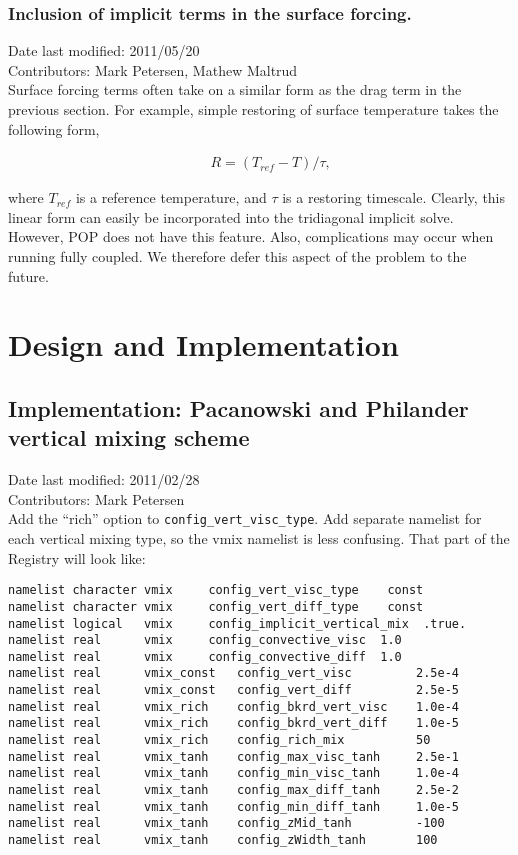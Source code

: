 \documentclass[11pt]{report}
\begin{document}
\subsection{Inclusion of implicit terms in the surface forcing.}
Date last modified: 2011/05/20 \\
Contributors: Mark Petersen, Mathew Maltrud \\

Surface forcing terms often take on a similar form as the drag term in the previous section.  For example, simple restoring of surface temperature takes the following form,

\begin{eqnarray}
&& R = (T_{ref} - T)/\tau,
\end{eqnarray}

where $T_{ref}$ is a reference temperature, and $\tau$ is a restoring timescale.  Clearly, this linear form can easily be incorporated into the tridiagonal implicit solve.  However, POP does not have this feature.  Also, complications may occur when running fully coupled.  We therefore defer this aspect of the problem to the future.


\chapter{Design and Implementation}

\section{Implementation: Pacanowski and Philander vertical mixing scheme}
Date last modified: 2011/02/28 \\
Contributors: Mark Petersen \\

Add the ``rich'' option to \verb=config_vert_visc_type=.  Add separate namelist for each vertical mixing type, so the vmix namelist is less confusing.  That part of the Registry will look like:
\begin{verbatim}
namelist character vmix     config_vert_visc_type    const
namelist character vmix     config_vert_diff_type    const
namelist logical   vmix     config_implicit_vertical_mix  .true.
namelist real      vmix     config_convective_visc  1.0
namelist real      vmix     config_convective_diff  1.0
namelist real      vmix_const   config_vert_visc         2.5e-4
namelist real      vmix_const   config_vert_diff         2.5e-5
namelist real      vmix_rich    config_bkrd_vert_visc    1.0e-4
namelist real      vmix_rich    config_bkrd_vert_diff    1.0e-5
namelist real      vmix_rich    config_rich_mix          50
namelist real      vmix_tanh    config_max_visc_tanh     2.5e-1
namelist real      vmix_tanh    config_min_visc_tanh     1.0e-4
namelist real      vmix_tanh    config_max_diff_tanh     2.5e-2
namelist real      vmix_tanh    config_min_diff_tanh     1.0e-5
namelist real      vmix_tanh    config_zMid_tanh         -100
namelist real      vmix_tanh    config_zWidth_tanh       100
\end{verbatim}
\end{document}
